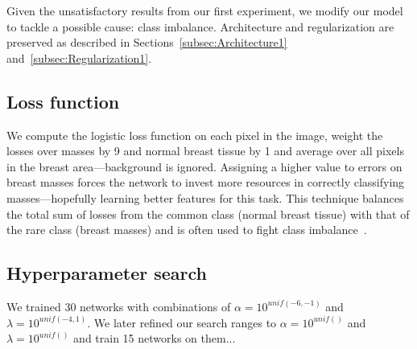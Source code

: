 Given the unsatisfactory results from our first experiment, we modify our model to tackle a possible cause: class imbalance. Architecture and regularization are preserved as described in Sections~\ref{subsec:Architecture1} and~\ref{subsec:Regularization1}.

\subsection{Loss function}
We compute the logistic loss function on each pixel in the image, weight the losses over masses by 9 and normal breast tissue by 1 and average over all pixels in the breast area---background is ignored. Assigning a higher value to errors on breast masses forces the network to invest more resources in correctly classifying masses---hopefully learning better features for this task.
This technique balances the total sum of losses from the common class (normal breast tissue) with that of the rare class (breast masses) and is often used to fight class imbalance~\cite{Provost2000}.

\subsection{Hyperparameter search}
We trained 30 networks with combinations of $\alpha = 10^{unif(-6, -1)}$ and $\lambda = 10^{unif(-4, 1)}$. We later refined our search ranges to $\alpha = 10^{unif()}$ and $\lambda = 10^{unif()}$ and train 15 networks on them...
